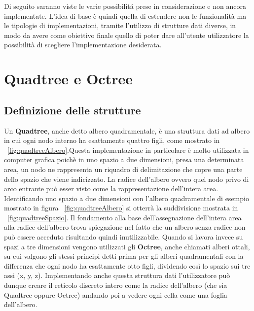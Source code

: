 \large
Di seguito saranno viste le varie possibilit\'a prese in considerazione e non ancora implementate. L'idea di base \`e quindi quella di estendere non le funzionalit\`a ma le tipologie di implementazioni, tramite l'utilizzo di strutture dati diverse, in modo da avere come obiettivo finale quello di poter dare all'utente utilizzatore la possibilit\`a di scegliere l'implementazione desiderata.
\section{Quadtree e Octree}
\subsection{Definizione delle strutture}


Un \textbf{Quadtree}, anche detto albero quadramentale, \`e una struttura dati ad albero in cui ogni nodo interno ha esattamente quattro figli, come mostrato in \figurename~\ref{fig:quadtreeAlbero}.Questa implementazione in particolare \`e molto utilizzata in computer grafica poich\`e in uno spazio a due dimensioni, presa una determinata area, un nodo ne rappresenta un riquadro di delimitazione che copre una parte dello spazio che viene indicizzato. La radice dell'albero ovvero quel nodo privo di arco entrante pu\`o esser visto come la rappresentazione dell'intera area. Identificando uno spazio a due dimensioni con l'albero quadramentale di esempio mostrato in figura \figurename~\ref{fig:quadtreeAlbero} si otterr\`a la suddivisione mostrata in \figurename~\ref{fig:quadtreeSpazio}. Il fondamento alla base dell'assegnazione dell'intera area alla radice dell'albero trova spiegazione nel fatto che un albero senza radice non pu\`o essere acceduto risultando quindi inutilizzabile.
Quando si lavora invece su spazi a tre dimensioni vengono utilizzati gli \textbf{Octree}, anche chiamati alberi ottali, su cui valgono gli stessi principi detti prima per gli alberi quadramentali con la differenza che ogni nodo ha esattamente otto figli, dividendo cos\`i lo spazio sui tre assi (x, y, z). Implementando anche questa struttura dati l'utilizzatore pu\`o dunque creare il reticolo discreto intero come la radice dell'albero (che sia Quadtree oppure Octree) andando poi a vedere ogni cella come una foglia dell'albero.

